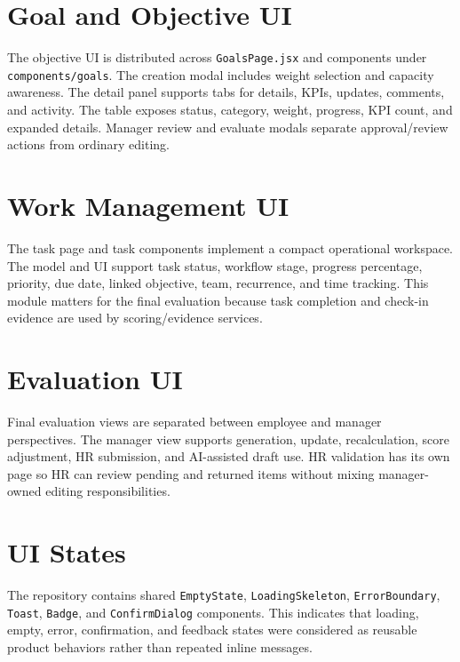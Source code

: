 \section{Goal and Objective UI}
The objective UI is distributed across \texttt{GoalsPage.jsx} and components under \texttt{components/goals}. The creation modal includes weight selection and capacity awareness. The detail panel supports tabs for details, KPIs, updates, comments, and activity. The table exposes status, category, weight, progress, KPI count, and expanded details. Manager review and evaluate modals separate approval/review actions from ordinary editing.

\section{Work Management UI}
The task page and task components implement a compact operational workspace. The model and UI support task status, workflow stage, progress percentage, priority, due date, linked objective, team, recurrence, and time tracking. This module matters for the final evaluation because task completion and check-in evidence are used by scoring/evidence services.

\section{Evaluation UI}
Final evaluation views are separated between employee and manager perspectives. The manager view supports generation, update, recalculation, score adjustment, HR submission, and AI-assisted draft use. HR validation has its own page so HR can review pending and returned items without mixing manager-owned editing responsibilities.

\section{UI States}
The repository contains shared \texttt{EmptyState}, \texttt{LoadingSkeleton}, \texttt{ErrorBoundary}, \texttt{Toast}, \texttt{Badge}, and \texttt{ConfirmDialog} components. This indicates that loading, empty, error, confirmation, and feedback states were considered as reusable product behaviors rather than repeated inline messages.
